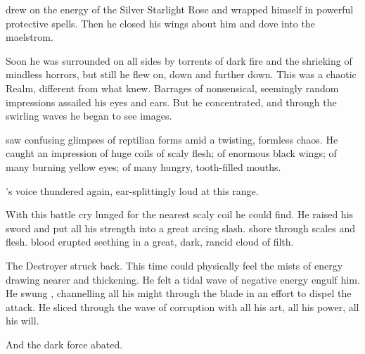 \Teshrial drew on the energy of the Silver Starlight Rose and wrapped himself in powerful protective spells. 
Then he closed his wings about him and dove into the maelstrom. 

Soon he was surrounded on all sides by torrents of dark fire and the shrieking of mindless horrors, but still he flew on, down and further down. 
This was a chaotic Realm, different from what \Teshrial knew. 
Barrages of nonsensical, seemingly random impressions assailed his eyes and ears. 
But he concentrated, and through the swirling waves he began to see images. 


\Teshrial saw confusing glimpses of reptilian forms amid a twisting, formless chaos.
He caught an impression of huge coils of scaly flesh; of enormous black wings; of many burning yellow eyes; of many hungry, tooth-filled mouths. 


\Ishnaruchaefir's voice thundered again, ear-splittingly loud at this range.  

With this battle cry \Teshrial lunged for the nearest scaly coil he could find. 
He raised his sword and put all his strength into a great arcing slash. 
\Turishah shore through scales and flesh. 
\Draconic blood erupted seething in a great, dark, rancid cloud of filth. 

The Destroyer struck back. 
This time \Teshrial could physically feel the mists of \xsic energy drawing nearer and thickening.  
% 
He felt a tidal wave of negative energy engulf him. 
He swung \Turishah, channelling all his might through the blade in an effort to dispel the attack. 
He sliced through the wave of corruption with all his art, all his power, all his will. 

And the dark force abated. 

